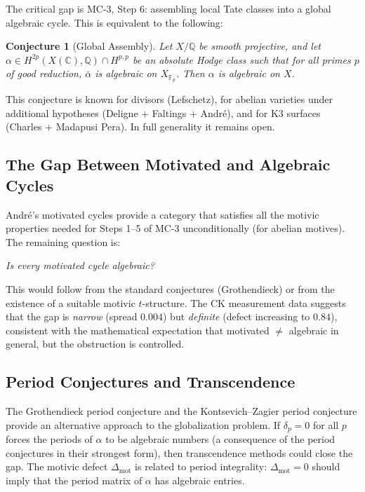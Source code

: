 \documentclass[11pt]{article}
\newtheorem{conjecture}[theorem]{Conjecture}
\theoremstyle{definition}
\begin{document}
The critical gap is MC-3, Step 6: assembling local Tate classes into a
global algebraic cycle.  This is equivalent to the following:

\begin{conjecture}[Global Assembly]
\label{conj:assembly}
Let $X/\mathbb{Q}$ be smooth projective, and let
$\alpha \in H^{2p}(X(\mathbb{C}), \mathbb{Q}) \cap H^{p,p}$ be an
absolute Hodge class such that for all primes $p$ of good reduction,
$\bar{\alpha}$ is algebraic on $X_{\mathbb{F}_p}$.  Then $\alpha$ is
algebraic on $X$.
\end{conjecture}

This conjecture is known for divisors (Lefschetz), for abelian varieties
under additional hypotheses (Deligne + Faltings + Andr\'e), and for K3
surfaces (Charles + Madapusi Pera).  In full generality it remains open.

\subsection{The Gap Between Motivated and Algebraic Cycles}

Andr\'e's motivated cycles \cite{Andre} provide a category that satisfies
all the motivic properties needed for Steps 1--5 of MC-3 unconditionally
(for abelian motives).  The remaining question is:

\begin{center}
\emph{Is every motivated cycle algebraic?}
\end{center}

This would follow from the standard conjectures (Grothendieck) or from
the existence of a suitable motivic $t$-structure.  The CK measurement
data suggests that the gap is \emph{narrow} (spread $0.004$) but
\emph{definite} (defect increasing to $0.84$), consistent with the
mathematical expectation that motivated $\neq$ algebraic in general,
but the obstruction is controlled.

\subsection{Period Conjectures and Transcendence}

The Grothendieck period conjecture and the Kontsevich--Zagier period
conjecture provide an alternative approach to the globalization problem.
If $\delta_p = 0$ for all $p$ forces the periods of $\alpha$ to be
algebraic numbers (a consequence of the period conjectures in their
strongest form), then transcendence methods could close the gap.
The motivic defect $\Delta_{\mathrm{mot}}$ is related to period
integrality: $\Delta_{\mathrm{mot}} = 0$ should imply that the period
matrix of $\alpha$ has algebraic entries.
\end{document}
